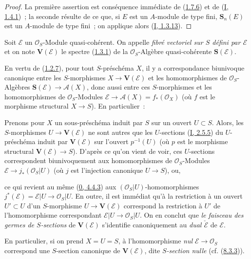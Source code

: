 \begin{proof}
La première assertion est conséquence immédiate de
(\hyperref[II.1.7.6-fr]{1.7.6}) et de
(\hyperref[I.1.4.1-fr]{I, 1.4.1})~; la seconde résulte de ce que, si $E$ est
un $A$-module de type fini, $\mathbf{S}_n(E)$ est un $A$-module de type
fini~; on applique alors (\hyperref[I.1.3.13-fr]{I, 1.3.13}).
\end{proof}

\begin{definition}[1.7.8]
\label{II.1.7.8-fr}
Soit $\mathcal{E}$ un $\mathcal{O}_S$-Module quasi-cohérent. On appelle
\emph{fibré vectoriel sur $S$ défini par $\mathcal{E}$} et on note
$\mathbf{V}(\mathcal{E})$ le spectre
(\hyperref[II.1.3.1-fr]{1.3.1}) de la $\mathcal{O}_S$-Algèbre quasi-cohérente
$\mathbf{S}(\mathcal{E})$.
\end{definition}

En vertu de (\hyperref[II.1.2.7-fr]{1.2.7}), pour tout $S$-préschéma $X$, il
y a correspondance biunivoque canonique entre les $S$-morphismes
$X\to\mathbf{V}(\mathcal{E})$ et les homomorphismes de
$\mathcal{O}_S$-Algèbres $\mathbf{S}(\mathcal{E})\to\mathcal{A}(X)$, donc
aussi entre ces $S$-morphismes et les homomorphismes de
$\mathcal{O}_S$-Modules
$\mathcal{E}\to\mathcal{A}(X)=f_*(\mathcal{O}_X)$ (où $f$ est le morphisme
structural $X\to S$). En particulier~:

\begin{env}[1.7.9]
\label{II.1.7.9-fr}
Prenons pour $X$ un sous-préschéma induit par $S$ sur un ouvert $U\subset S$.
Alors, les $S$-morphismes $U\to\mathbf{V}(\mathcal{E})$ ne sont autres que
les $U$-sections (\hyperref[I.2.5.5-fr]{I, 2.5.5}) du $U$-préschéma induit
par $\mathbf{V}(\mathcal{E})$ sur l'ouvert $p^{-1}(U)$ (où $p$ est le
morphisme structural $\mathbf{V}(\mathcal{E})\to S$). D'après ce qu'on vient
de voir, ces $U$-sections correspondent biunivoquement aux homomorphismes de
$\mathcal{O}_S$-Modules
$\mathcal{E}\to j_*(\mathcal{O}_S|U)$ (où $j$ est l'injection canonique
$U\to S$), ou,

ce qui revient au même (\hyperref[0.4.4.3-fr]{0, 4.4.3}) aux
$(\mathcal{O}_S|U)$-homomorphismes
$j^*(\mathcal{E})=\mathcal{E}|U\to\mathcal{O}_S|U$. En outre, il est
immédiat qu'à la restriction à un ouvert $U'\subset U$ d'un $S$-morphisme
$U\to\mathbf{V}(\mathcal{E})$ correspond la restriction à $U'$ de
l'homomorphisme correspondant
$\mathcal{E}|U\to\mathcal{O}_S|U$. On en conclut que \emph{le faisceau des
germes de $S$-sections} de $\mathbf{V}(\mathcal{E})$ s'identifie
canoniquement au \emph{dual $\check{\mathcal{E}}$} de $\mathcal{E}$.

En particulier, si on prend $X=U=S$, à l'homomorphisme \emph{nul}
$\mathcal{E}\to\mathcal{O}_S$ correspond une $S$-section canonique de
$\mathbf{V}(\mathcal{E})$, dite \emph{$S$-section nulle}
(cf. (\hyperref[II.8.3.3-fr]{8.3.3})).
\end{env}

